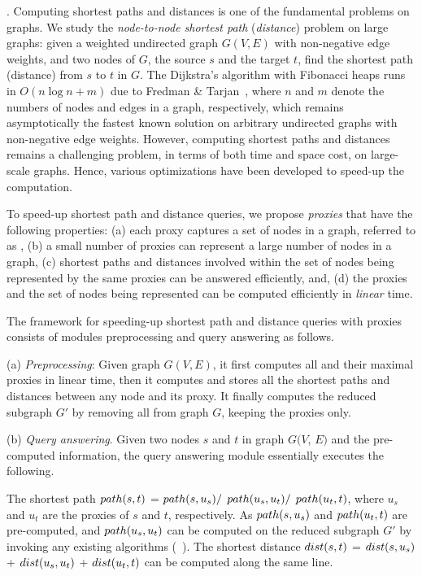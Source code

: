. Computing shortest paths and distances is one of the fundamental problems on graphs. We study the {\em node-to-node shortest path} ({\em distance}) problem on large graphs: given a weighted undirected graph $G(V, E)$ with non-negative edge weights, and two nodes of $G$, the source $s$ and the target $t$, find the shortest path (distance) from $s$ to $t$ in $G$. The Dijkstra's algorithm with Fibonacci heaps runs in $O(n\log n + m)$ due to Fredman \& Tarjan~\cite{CormenLRS01}, where $n$ and $m$ denote the numbers of nodes and edges in a graph, respectively, which remains asymptotically the fastest known solution on arbitrary undirected graphs with non-negative edge weights.
However, computing shortest  paths and distances remains a challenging problem, in terms of both time and space cost, on large-scale graphs. Hence, various optimizations have been developed to speed-up the computation.

To speed-up shortest  path and distance queries, we propose {\em proxies} that have the following properties:
%
(a) each proxy captures a set of nodes in a graph, referred to as \dra,
%
(b) a small number of proxies can represent a large number of nodes in a graph,
%
(c) shortest paths and distances involved within the set of nodes being represented by the same proxies can be answered efficiently, and,
%
(d) the proxies and the set of nodes being represented can be computed efficiently in {\em linear} time.



The framework for speeding-up shortest path and distance queries with proxies consists of modules preprocessing and query answering as follows.


\ni(a) {\em Preprocessing}: Given graph $G(V, E)$, it first computes all \dras and their maximal proxies in linear time, then it computes and stores all the shortest paths and distances between any node and its proxy. It finally computes the reduced subgraph $G'$ by removing all \dras from graph $G$, \ie keeping the proxies only.


\ni(b) {\em Query answering}. Given two nodes $s$ and $t$ in graph $G(V$, $E)$  and the pre-computed information, the query answering module essentially executes the following.

The shortest path $\path(s, t)$ = $\path(s, u_s)/$ $\path(u_s, u_t)/$ $\path(u_t, t)$, where $u_s$ and $u_t$ are the proxies of $s$ and $t$, respectively.
As  $\path(s, u_s)$ and $\path(u_t, t)$ are pre-computed, and $\path(u_s, u_t)$ can be computed on the reduced subgraph $G'$ by invoking any existing algorithms
(\eg \ah~\cite{zhu2013shortest}).
%
The shortest distance $\dist(s, t)$ = $\dist(s, u_s)$ + $\dist(u_s, u_t)$ + $\dist(u_t, t)$ can be computed along the same line.

